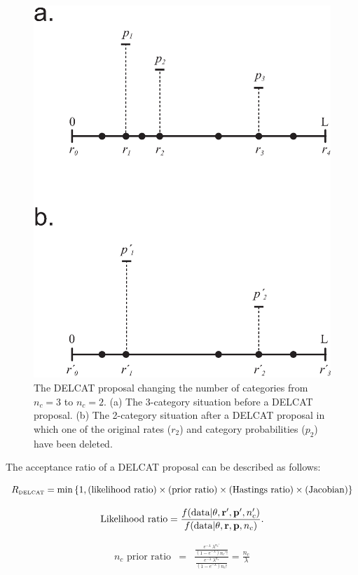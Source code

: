 \documentclass[12pt]{article}
\newcommand{\ncat}{n_c}
\begin{document}
%
%
\begin{figure}
\centering
\hfil\includegraphics[scale=0.7]{delcat.eps}\hfil
\caption{The DELCAT proposal changing the number of categories from $\ncat = 3$ to $\ncat = 2$. (a) The 3-category situation before a DELCAT proposal. (b) The 2-category situation after a DELCAT proposal in which one of the original rates ($r_2$) and category probabilities ($p_2$) have been deleted.}
\label{delcat}
\end{figure}

The acceptance ratio of a DELCAT proposal can be described as follows:

\[ R_{\mbox{\tiny DELCAT}} = \min \left\{1, (\mbox{likelihood ratio}) \times (\mbox{prior ratio}) \times (\mbox{Hastings ratio}) \times (\mbox{Jacobian}) \right\} \]

\[ \mbox{Likelihood ratio} = \frac{f(\mbox{data} | {\bf \theta}, {\bf r}', {\bf p}', \ncat')}{f(\mbox{data} | {\bf \theta}, {\bf r}, {\bf p}, \ncat)}. \]

\begin{eqnarray*}
\mbox{$\ncat$ prior ratio} & = & \frac{\frac{e^{-\lambda} \; \lambda^{\ncat'}}{\left( 1 - e^{-\lambda} \right) {\ncat'}!}}{\frac{e^{-\lambda} \; \lambda^{\ncat}}{\left( 1 - e^{-\lambda} \right) {\ncat}!}} = \frac{\ncat}{\lambda}
\end{eqnarray*}
\end{document}
